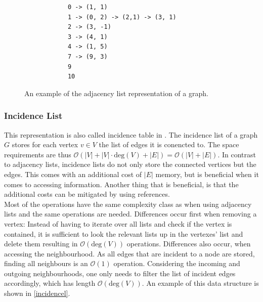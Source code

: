         \begin{figure}[htp]
         \begin{center}
          \begin{verbatim}
            0 -> (1, 1)
            1 -> (0, 2) -> (2,1) -> (3, 1)
            2 -> (3, -1)
            3 -> (4, 1)
            4 -> (1, 5)
            7 -> (9, 3)
            9
            10
          \end{verbatim}
         \end{center}
         \caption{An example of the adjacency list representation of a graph.}
         \label{adjl}
        \end{figure}
        
        \subsubsection*{Incidence List}
        This representation is also called incidence table in \autocite{Gross1998GraphTA}.
        The incidence list of a graph $G$ stores for each vertex $v \in V$ the list of edges it is conencted to. 
        The space requirements are thus $\mathcal{O}(|V| + |V| \cdot \text{deg}(V) + |E|) = \mathcal{O}(|V| + |E|)$. 
        In contrast to adjacency lists, incidence lists do not only store the connected vertices but the edges. 
        This comes with an additional cost of $|E|$ memory, but is beneficial when it comes to accessing information. 
        Another thing that is beneficial, is that the additional costs can be mitigated by using references. \\
        
        Most of the operations have the same complexity class as when using adjacency lists and the same operations are needed. 
        Differences occur first when removing a vertex:
        Instead of having to iterate over all lists and check if the vertex is contained, it is sufficient to look the relevant lists up in the vertexes' list and delete them resulting in $\mathcal{O}(\text{deg}(V))$ operations.        
        Differences also occur, when accessing the neighbourhood. 
        As all edges that are incident to a node are stored, finding all neighbours is an $\mathcal{O}(1)$ operation. 
        Considering the incoming and outgoing neighbourhoods, one only needs to filter the list of incident edges accordingly, which has length $\mathcal{O}(\text{deg}(V))$.
        An example of this data structure is shown in \ref{incidencel}.
        
